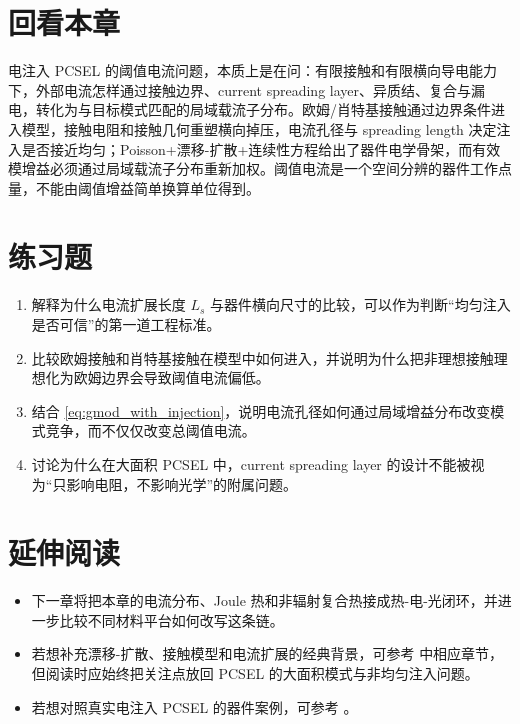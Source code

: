 \section*{回看本章}
电注入 PCSEL 的阈值电流问题，本质上是在问：有限接触和有限横向导电能力下，外部电流怎样通过接触边界、current spreading layer、异质结、复合与漏电，转化为与目标模式匹配的局域载流子分布。欧姆/肖特基接触通过边界条件进入模型，接触电阻和接触几何重塑横向掉压，电流孔径与 spreading length 决定注入是否接近均匀；Poisson+漂移-扩散+连续性方程给出了器件电学骨架，而有效模增益必须通过局域载流子分布重新加权。阈值电流是一个空间分辨的器件工作点量，不能由阈值增益简单换算单位得到。

\section*{练习题}
\begin{enumerate}
  \item \basicq 解释为什么电流扩展长度 $L_s$ 与器件横向尺寸的比较，可以作为判断“均匀注入是否可信”的第一道工程标准。

  \item \basicq 比较欧姆接触和肖特基接触在模型中如何进入，并说明为什么把非理想接触理想化为欧姆边界会导致阈值电流偏低。

  \item \midq 结合 \cref{eq:gmod_with_injection}，说明电流孔径如何通过局域增益分布改变模式竞争，而不仅仅改变总阈值电流。

  \item \hardq 讨论为什么在大面积 PCSEL 中，current spreading layer 的设计不能被视为“只影响电阻，不影响光学”的附属问题。
\end{enumerate}

\section*{延伸阅读}
\begin{itemize}
  \item 下一章将把本章的电流分布、Joule 热和非辐射复合热接成热-电-光闭环，并进一步比较不同材料平台如何改写这条链。

  \item 若想补充漂移-扩散、接触模型和电流扩展的经典背景，可参考 \cite{coldren2012} 中相应章节，但阅读时应始终把关注点放回 PCSEL 的大面积模式与非均匀注入问题。

  \item 若想对照真实电注入 PCSEL 的器件案例，可参考 \cite{hirose2014,wang2024,zhoupan2023}。
\end{itemize}
